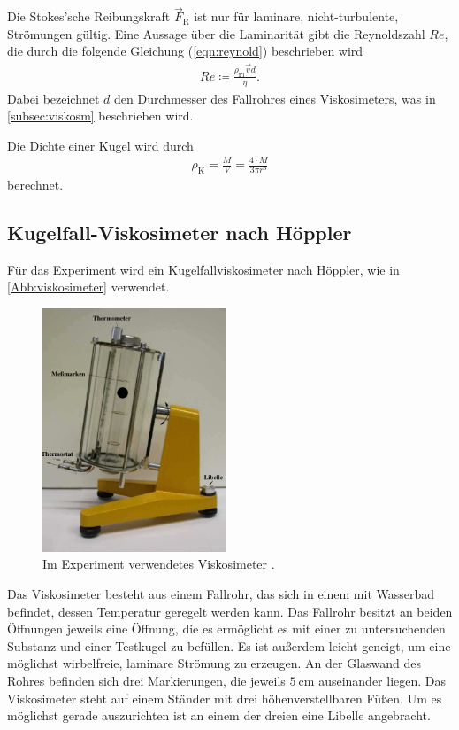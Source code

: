 Die Stokes'sche Reibungskraft $\vec F_{\text{R}}$ ist nur für laminare, nicht-turbulente, Strömungen gültig. Eine Aussage
über die Laminarität gibt die Reynoldszahl $Re$, die durch die folgende Gleichung (\ref{eqn:reynold}) beschrieben wird
\begin{align}
    \label{eqn:reynold}
    Re \coloneq \frac{\rho_{\text{Fl}} \vec v d}{\eta}.
\end{align}
Dabei bezeichnet $d$ den Durchmesser des Fallrohres eines Viskosimeters, was in \autoref{subsec:viskosm} beschrieben wird.

Die Dichte einer Kugel wird durch
\begin{align}
    \label{eqn:vKugel}
    \rho_{\text{K}} = \frac{M}{V} = \frac{4\cdot M}{3\pi r^3}
\end{align}
berechnet.

\subsection{Kugelfall-Viskosimeter nach Höppler}
\label{subsec:viskosm}
Für das Experiment wird ein Kugelfallviskosimeter nach Höppler, wie in \autoref{Abb:viskosimeter} verwendet.

\begin{figure}
    \centering
    \includegraphics[width=5.5cm]{Dateien/Viskosimeter.png}
    \caption{Im Experiment verwendetes Viskosimeter \cite{anleitung107}.}
    \label{Abb:viskosimeter}
\end{figure}

Das Viskosimeter besteht aus einem Fallrohr, das sich in einem mit Wasserbad befindet, dessen Temperatur geregelt werden kann.
Das Fallrohr besitzt an beiden Öffnungen jeweils eine Öffnung, die es ermöglicht es mit einer zu untersuchenden Substanz und einer
Testkugel zu befüllen. Es ist außerdem leicht geneigt, um eine möglichst wirbelfreie, laminare Strömung zu erzeugen. 
An der Glaswand des Rohres befinden sich drei Markierungen, die jeweils $\SI{5}{\cm}$ auseinander liegen. Das Viskosimeter steht auf einem
Ständer mit drei höhenverstellbaren Füßen. Um es möglichst gerade auszurichten ist an einem der dreien eine Libelle angebracht.